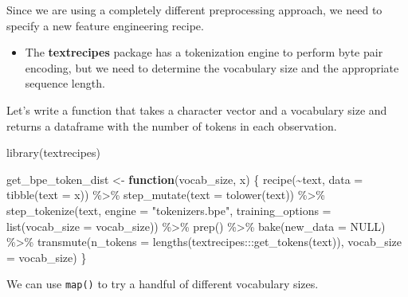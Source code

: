 \documentclass[
]{krantz}
\makeatletter
\newenvironment{Shaded}{\begin{snugshade}}{\end{snugshade}}
\newcommand{\AttributeTok}[1]{\textcolor[rgb]{0.77,0.63,0.00}{#1}}
\newcommand{\ConstantTok}[1]{\textcolor[rgb]{0.00,0.00,0.00}{#1}}
\newcommand{\ControlFlowTok}[1]{\textcolor[rgb]{0.13,0.29,0.53}{\textbf{#1}}}
\newcommand{\DecValTok}[1]{\textcolor[rgb]{0.00,0.00,0.81}{#1}}
\newcommand{\FunctionTok}[1]{\textcolor[rgb]{0.00,0.00,0.00}{#1}}
\newcommand{\NormalTok}[1]{#1}
\newcommand{\OtherTok}[1]{\textcolor[rgb]{0.56,0.35,0.01}{#1}}
\newcommand{\SpecialCharTok}[1]{\textcolor[rgb]{0.00,0.00,0.00}{#1}}
\newcommand{\StringTok}[1]{\textcolor[rgb]{0.31,0.60,0.02}{#1}}
\newenvironment{kframe}{%
\medskip{}
\setlength{\fboxsep}{.8em}
 \def\at@end@of@kframe{}%
 \ifinner\ifhmode%
  \def\at@end@of@kframe{\end{minipage}}%
  \begin{minipage}{\columnwidth}%
 \fi\fi%
 \def\FrameCommand##1{\hskip\@totalleftmargin \hskip-\fboxsep
 \colorbox{shadecolor}{##1}\hskip-\fboxsep
     \hskip-\linewidth \hskip-\@totalleftmargin \hskip\columnwidth}%
 \MakeFramed {\advance\hsize-\width
   \@totalleftmargin\z@ \linewidth\hsize
   \@setminipage}}%
 {\par\unskip\endMakeFramed%
 \at@end@of@kframe}
\renewenvironment{Shaded}{\begin{kframe}}{\end{kframe}}
\newenvironment{rmdblock}[1]
  {\begin{shaded*}
  \begin{itemize}[left = -1cm, labelsep = 1cm]
  \renewcommand{\labelitemi}{
    \raisebox{-.7\height}[0pt][0pt]{
      {\setkeys{Gin}{width=3em,keepaspectratio}\texttt{[image: images/\#1]}}
    }
  }
 
  \item
  }
  {
  \end{itemize}
  \end{shaded*}
  }
\newenvironment{rmdpackage}
  {\begin{rmdblock}{package}}
  {\end{rmdblock}}
\makeatother
\begin{document}
Since we are using a completely different preprocessing approach, we need to specify a new feature engineering recipe.

\begin{rmdpackage}
The \textbf{textrecipes} package has a tokenization engine to perform
byte pair encoding, but we need to determine the vocabulary size and the
appropriate sequence length.
\end{rmdpackage}

Let's write a function that takes a character vector and a vocabulary size and returns a dataframe with the number of tokens in each observation.

\begin{Shaded}
\begin{Highlighting}[]
\FunctionTok{library}\NormalTok{(textrecipes)}

\NormalTok{get\_bpe\_token\_dist }\OtherTok{\textless{}{-}} \ControlFlowTok{function}\NormalTok{(vocab\_size, x) \{}
  \FunctionTok{recipe}\NormalTok{(}\SpecialCharTok{\textasciitilde{}}\NormalTok{text, }\AttributeTok{data =} \FunctionTok{tibble}\NormalTok{(}\AttributeTok{text =}\NormalTok{ x)) }\SpecialCharTok{\%\textgreater{}\%}
    \FunctionTok{step\_mutate}\NormalTok{(}\AttributeTok{text =} \FunctionTok{tolower}\NormalTok{(text)) }\SpecialCharTok{\%\textgreater{}\%}
    \FunctionTok{step\_tokenize}\NormalTok{(text,}
                  \AttributeTok{engine =} \StringTok{"tokenizers.bpe"}\NormalTok{,}
                  \AttributeTok{training\_options =} \FunctionTok{list}\NormalTok{(}\AttributeTok{vocab\_size =}\NormalTok{ vocab\_size)) }\SpecialCharTok{\%\textgreater{}\%}
    \FunctionTok{prep}\NormalTok{() }\SpecialCharTok{\%\textgreater{}\%}
    \FunctionTok{bake}\NormalTok{(}\AttributeTok{new\_data =} \ConstantTok{NULL}\NormalTok{) }\SpecialCharTok{\%\textgreater{}\%}
    \FunctionTok{transmute}\NormalTok{(}\AttributeTok{n\_tokens =} \FunctionTok{lengths}\NormalTok{(textrecipes}\SpecialCharTok{:::}\FunctionTok{get\_tokens}\NormalTok{(text)),}
              \AttributeTok{vocab\_size =}\NormalTok{ vocab\_size)}
\NormalTok{\}}
\end{Highlighting}
\end{Shaded}

We can use \texttt{map()} to try a handful of different vocabulary sizes.

\begin{Shaded}
\end{Shaded}
\end{document}
